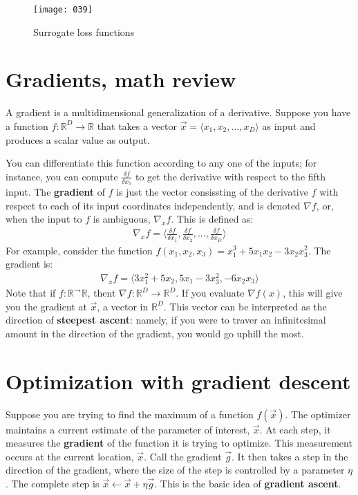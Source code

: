 \begin{figure}[t]
    \begin{center}
        \texttt{[image: 039]}
        \vspace*{-25pt}
    \end{center}
    \caption{Surrogate loss functions}
    \label{fig:039}
    \end{figure}

\section{Gradients, math review}
A gradient is a multidimensional generalization of a derivative. Suppose you have a function \(f : \mathbb{R}^D \to \mathbb{R}\) that takes a vector \(\vec{x} = \langle x_1, x_2, ..., x_D \rangle \) as input and produces a scalar value as output.

You can differentiate this function according to any one of the inputs; for instance, you can compute \(\frac {\delta f} {\delta x_5}\) to get the derivative with respect to the fifth input. The \textbf{gradient} of \(f\) is just the vector consissting of the derivative \(f\) with respect to each of its input coordinates independently, and is denoted \(\nabla f\), or, when the input to \(f\) is ambiguous, \(\nabla_x f\). This is defined as:
\begin{align}
    \nabla_x f = \langle \frac{\delta f}{\delta x_1}, \frac{\delta f}{\delta x_2}, ..., \frac{\delta f}{\delta x_D} \rangle
\end{align}
For example, consider the function \(f(x_1,x_2,x_3) = x_1^3+5x_1x_2-3x_2x_3^2\). The gradient is:
\begin{align}
    \nabla_x f = \langle 3x_1^2 + 5x_2, 5x_1-3x_3^2, -6x_2x_3 \rangle
\end{align}
Note that if \(f : \mathbb{R}^ \to \mathbb{R}\), thent \(\nabla f : \mathbb{R}^D \to \mathbb{R}^D\). If you evaluate \(\nabla f(x)\), this will give you the gradient at \(\vec{x}\), a vector in \(\mathbb{R}^D\). This vector can be interpreted as the direction of \textbf{steepest ascent}: namely, if you were to traver an infinitesimal amount in the direction of the gradient, you would go uphill the most.

\section{Optimization with gradient descent}
Suppose you are trying to find the maximum of a function \(f(\vec{x})\). The optimizer maintains a current estimate of the parameter of interest, \(\vec{x}\). At each step, it measures the \textbf{gradient} of the function it is trying to optimize. This measurement occurs at the current location, \(\vec{x}\). Call the gradient \(\vec{g}\). It then takes a step in the direction of the gradient, where the size of the step is controlled by a parameter \(\eta\). The complete step is \(\vec{x} \gets \vec{x} + \eta \vec{g}\). This is the basic idea of \textbf{gradient ascent}.

